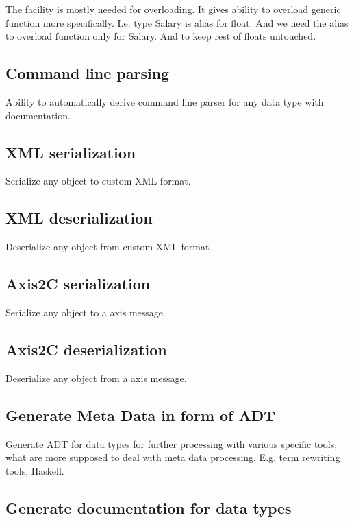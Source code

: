 \documentclass[a4paper]{article}
\begin{document}
The facility is mostly needed for overloading. It gives ability to overload generic function more specifically.
I.e. type Salary is alias for float. And we need the alias to overload function only for Salary. And to keep rest of floats untouched.

\subsection{Command line parsing}

Ability to automatically derive command line parser for any data type with documentation.

\subsection{XML serialization}

Serialize any object to custom XML format.

\subsection{XML deserialization}

Deserialize any object from custom XML format.

\subsection{Axis2C serialization}

Serialize any object to a axis message.

\subsection{Axis2C deserialization}

Deserialize any object from a axis message.

\subsection{Generate Meta Data in form of ADT}

Generate ADT for data types for further processing with various specific tools, what are more supposed to deal with meta data processing.
E.g. term rewriting tools, Haskell.

\subsection{Generate documentation for data types}
\end{document}
